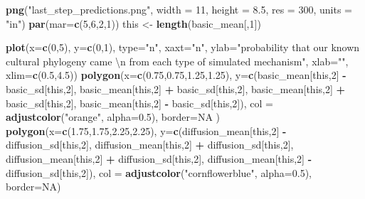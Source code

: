 \documentclass[]{book}
\newenvironment{Shaded}{\begin{snugshade}}{\end{snugshade}}
\newcommand{\KeywordTok}[1]{\textcolor[rgb]{0.13,0.29,0.53}{\textbf{{#1}}}}
\newcommand{\DataTypeTok}[1]{\textcolor[rgb]{0.13,0.29,0.53}{{#1}}}
\newcommand{\DecValTok}[1]{\textcolor[rgb]{0.00,0.00,0.81}{{#1}}}
\newcommand{\FloatTok}[1]{\textcolor[rgb]{0.00,0.00,0.81}{{#1}}}
\newcommand{\CharTok}[1]{\textcolor[rgb]{0.31,0.60,0.02}{{#1}}}
\newcommand{\StringTok}[1]{\textcolor[rgb]{0.31,0.60,0.02}{{#1}}}
\newcommand{\OtherTok}[1]{\textcolor[rgb]{0.56,0.35,0.01}{{#1}}}
\newcommand{\OperatorTok}[1]{\textcolor[rgb]{0.81,0.36,0.00}{\textbf{{#1}}}}
\newcommand{\NormalTok}[1]{{#1}}
\theoremstyle{definition}
\theoremstyle{definition}
\theoremstyle{definition}
\theoremstyle{remark}
\begin{document}
\begin{Shaded}
\begin{Highlighting}[]
\KeywordTok{png}\NormalTok{(}\StringTok{"last_step_predictions.png"}\NormalTok{, }\DataTypeTok{width =} \DecValTok{11}\NormalTok{, }\DataTypeTok{height =} \FloatTok{8.5}\NormalTok{, }\DataTypeTok{res =} \DecValTok{300}\NormalTok{, }\DataTypeTok{units =} \StringTok{"in"}\NormalTok{)}
\KeywordTok{par}\NormalTok{(}\DataTypeTok{mar=}\KeywordTok{c}\NormalTok{(}\DecValTok{5}\NormalTok{,}\DecValTok{6}\NormalTok{,}\DecValTok{2}\NormalTok{,}\DecValTok{1}\NormalTok{))}
\NormalTok{this <-}\StringTok{ }\KeywordTok{length}\NormalTok{(basic_mean[,}\DecValTok{1}\NormalTok{])}

\KeywordTok{plot}\NormalTok{(}\DataTypeTok{x=}\KeywordTok{c}\NormalTok{(}\DecValTok{0}\NormalTok{,}\DecValTok{5}\NormalTok{), }\DataTypeTok{y=}\KeywordTok{c}\NormalTok{(}\DecValTok{0}\NormalTok{,}\DecValTok{1}\NormalTok{), }\DataTypeTok{type=}\StringTok{"n"}\NormalTok{,  }\DataTypeTok{xaxt=}\StringTok{"n"}\NormalTok{, }\DataTypeTok{ylab=}\StringTok{"probability that our known cultural phylogeny came }\CharTok{\textbackslash{}n}\StringTok{ from each type of simulated mechanism"}\NormalTok{, }\DataTypeTok{xlab=}\StringTok{""}\NormalTok{, }\DataTypeTok{xlim=}\KeywordTok{c}\NormalTok{(}\FloatTok{0.5}\NormalTok{,}\FloatTok{4.5}\NormalTok{))}
\KeywordTok{polygon}\NormalTok{(}\DataTypeTok{x=}\KeywordTok{c}\NormalTok{(}\FloatTok{0.75}\NormalTok{,}\FloatTok{0.75}\NormalTok{,}\FloatTok{1.25}\NormalTok{,}\FloatTok{1.25}\NormalTok{), }\DataTypeTok{y=}\KeywordTok{c}\NormalTok{(basic_mean[this,}\DecValTok{2}\NormalTok{] }\OperatorTok{-}\StringTok{ }\NormalTok{basic_sd[this,}\DecValTok{2}\NormalTok{], basic_mean[this,}\DecValTok{2}\NormalTok{] }\OperatorTok{+}\StringTok{ }\NormalTok{basic_sd[this,}\DecValTok{2}\NormalTok{], basic_mean[this,}\DecValTok{2}\NormalTok{] }\OperatorTok{+}\StringTok{ }\NormalTok{basic_sd[this,}\DecValTok{2}\NormalTok{], basic_mean[this,}\DecValTok{2}\NormalTok{] }\OperatorTok{-}\StringTok{ }\NormalTok{basic_sd[this,}\DecValTok{2}\NormalTok{]), }\DataTypeTok{col =} \KeywordTok{adjustcolor}\NormalTok{(}\StringTok{"orange"}\NormalTok{, }\DataTypeTok{alpha=}\FloatTok{0.5}\NormalTok{), }\DataTypeTok{border=}\OtherTok{NA}\NormalTok{ )}
\KeywordTok{polygon}\NormalTok{(}\DataTypeTok{x=}\KeywordTok{c}\NormalTok{(}\FloatTok{1.75}\NormalTok{,}\FloatTok{1.75}\NormalTok{,}\FloatTok{2.25}\NormalTok{,}\FloatTok{2.25}\NormalTok{), }\DataTypeTok{y=}\KeywordTok{c}\NormalTok{(diffusion_mean[this,}\DecValTok{2}\NormalTok{] }\OperatorTok{-}\StringTok{ }\NormalTok{diffusion_sd[this,}\DecValTok{2}\NormalTok{], diffusion_mean[this,}\DecValTok{2}\NormalTok{] }\OperatorTok{+}\StringTok{ }\NormalTok{diffusion_sd[this,}\DecValTok{2}\NormalTok{], diffusion_mean[this,}\DecValTok{2}\NormalTok{] }\OperatorTok{+}\StringTok{ }\NormalTok{diffusion_sd[this,}\DecValTok{2}\NormalTok{], diffusion_mean[this,}\DecValTok{2}\NormalTok{] }\OperatorTok{-}\StringTok{ }\NormalTok{diffusion_sd[this,}\DecValTok{2}\NormalTok{]), }\DataTypeTok{col =} \KeywordTok{adjustcolor}\NormalTok{(}\StringTok{"cornflowerblue"}\NormalTok{, }\DataTypeTok{alpha=}\FloatTok{0.5}\NormalTok{), }\DataTypeTok{border=}\OtherTok{NA}\NormalTok{)}

\end{Highlighting}
\end{Shaded}
\end{document}
